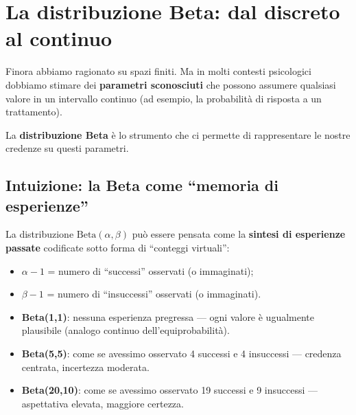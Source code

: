 \documentclass[
  italian,
  letterpaper,
  a4paper,
  11pt,
  open=any]{scrbook}
\theoremstyle{plain}
\theoremstyle{definition}
\theoremstyle{definition}
\theoremstyle{remark}
\begin{document}
\section{La distribuzione Beta: dal discreto al
continuo}\label{sec-beta-distribution}

Finora abbiamo ragionato su spazi finiti. Ma in molti contesti
psicologici dobbiamo stimare dei \textbf{parametri sconosciuti} che
possono assumere qualsiasi valore in un intervallo continuo (ad esempio,
la probabilità di risposta a un trattamento).

La \textbf{distribuzione Beta} è lo strumento che ci permette di
rappresentare le nostre credenze su questi parametri.

\subsection{Intuizione: la Beta come ``memoria di
esperienze''}\label{intuizione-la-beta-come-memoria-di-esperienze}

La distribuzione \(\text{Beta}(\alpha, \beta)\) può essere pensata come
la \textbf{sintesi di esperienze passate} codificate sotto forma di
``conteggi virtuali'':

\begin{itemize}
\item
  \(\alpha - 1\) = numero di ``successi'' osservati (o immaginati);
\item
  \(\beta - 1\) = numero di ``insuccessi'' osservati (o immaginati).
\item
  \textbf{Beta(1,1)}: nessuna esperienza pregressa --- ogni valore è
  ugualmente plausibile (analogo continuo dell'equiprobabilità).
\item
  \textbf{Beta(5,5)}: come se avessimo osservato 4 successi e 4
  insuccessi --- credenza centrata, incertezza moderata.
\item
  \textbf{Beta(20,10)}: come se avessimo osservato 19 successi e 9
  insuccessi --- aspettativa elevata, maggiore certezza.
\end{itemize}
\end{document}
